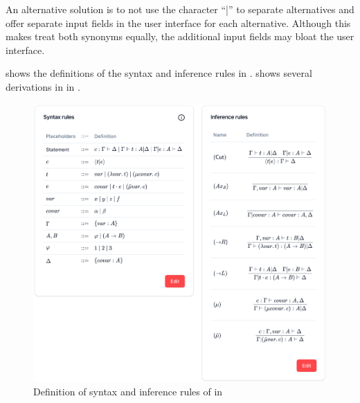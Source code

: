 An alternative solution is to not use the character ``|'' to separate alternatives and offer separate input fields in the user interface for each alternative. Although this makes \projectname{} treat both synonyms equally, the additional input fields may bloat the user interface.

 shows the definitions of the syntax and inference rules in \projectname{}.  shows several derivations in \lbm{} in \projectname{}.

\begin{figure}[!htbp]
    \centering
    \includegraphics[width=\textwidth]{evaluation/lambda-bar-mu-definition.png}
    \caption{Definition of syntax and inference rules of \lbm{} in \projectname{}}
    \label{fig:evaluation:lambda-bar-mu-definition}
\end{figure}


